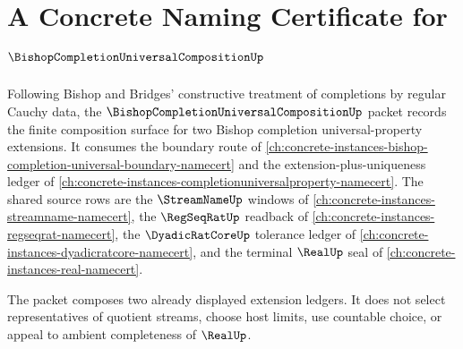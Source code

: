\chapter{A Concrete Naming Certificate for $\BishopCompletionUniversalCompositionUp$}
\label{ch:concrete-instances-bishop-completion-universal-composition-namecert}

Following Bishop and Bridges' constructive treatment of completions by regular Cauchy data, the $\BishopCompletionUniversalCompositionUp$ packet records the finite composition surface for two Bishop completion universal-property extensions. It consumes the boundary route of \autoref{ch:concrete-instances-bishop-completion-universal-boundary-namecert} and the extension-plus-uniqueness ledger of \autoref{ch:concrete-instances-completionuniversalproperty-namecert}. The shared source rows are the $\StreamNameUp$ windows of \autoref{ch:concrete-instances-streamname-namecert}, the $\RegSeqRatUp$ readback of \autoref{ch:concrete-instances-regseqrat-namecert}, the $\DyadicRatCoreUp$ tolerance ledger of \autoref{ch:concrete-instances-dyadicratcore-namecert}, and the terminal $\RealUp$ seal of \autoref{ch:concrete-instances-real-namecert}.

The packet composes two already displayed extension ledgers. It does not select representatives of quotient streams, choose host limits, use countable choice, or appeal to ambient completeness of $\RealUp$.

